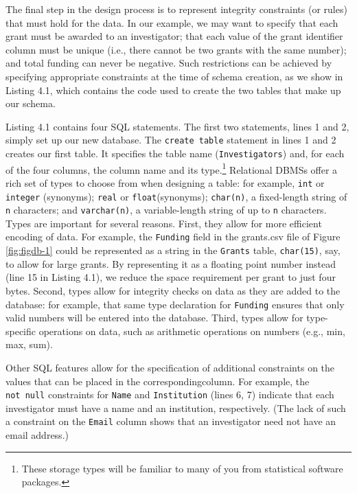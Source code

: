 \documentclass[]{krantz}
\begin{document}
The final step in the design process is to represent integrity
constraints (or rules) that must hold for the data. In our example, we
may want to specify that each grant must be awarded to an investigator;
that each value of the grant identifier column must be unique (i.e.,
there cannot be two grants with the same number); and total funding can
never be negative. Such restrictions can be achieved by specifying
appropriate constraints at the time of schema creation, as we show in
Listing 4.1, which contains the code used to create the two tables that
make up our schema.

Listing 4.1 contains four SQL statements. The first two statements,
lines 1 and 2, simply set up our new database. The
\texttt{create\ table} statement in lines 1 and 2 creates our first
table. It specifies the table name (\texttt{Investigators}) and, for
each of the four columns, the column name and its type.\footnote{These
  storage types will be familiar to many of you from statistical
  software packages.} Relational DBMSs offer a rich set of types to
choose from when designing a table: for example, \texttt{int} or
\texttt{integer} (synonyms); \texttt{real} or \texttt{float}(synonyms);
\texttt{char(n)}, a fixed-length string of \texttt{n} characters; and
\texttt{varchar(n)}, a variable-length string of up to \texttt{n}
characters. Types are important for several reasons. First, they allow
for more efficient encoding of data. For example, the \texttt{Funding}
field in the grants.csv file of Figure \ref{fig:figdb-1} could be
represented as a string in the \texttt{Grants} table, \texttt{char(15)},
say, to allow for large grants. By representing it as a floating point
number instead (line 15 in Listing 4.1), we reduce the space requirement
per grant to just four bytes. Second, types allow for integrity checks
on data as they are added to the database: for example, that same type
declaration for \texttt{Funding} ensures that only valid numbers will be
entered into the database. Third, types allow for type-specific
operations on data, such as arithmetic operations on numbers (e.g., min,
max, sum).

Other SQL features allow for the specification of additional constraints
on the values that can be placed in the correspondingcolumn. For
example, the \texttt{not\ null} constraints for \texttt{Name} and
\texttt{Institution} (lines 6, 7) indicate that each investigator must
have a name and an institution, respectively. (The lack of such a
constraint on the \texttt{Email} column shows that an investigator need
not have an email address.)
\end{document}
